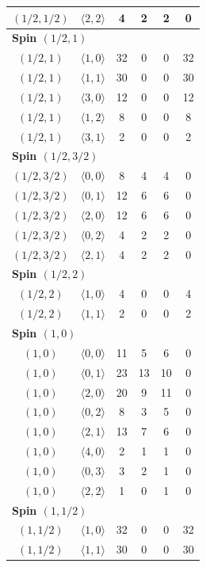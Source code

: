 \begin{longtable}{c c c c c c}
$(1/2,1/2)$ & $\langle 2,2\rangle$ & 4 & 2 & 2 & 0 \\
\midrule
\multicolumn{6}{l}{\textbf{Spin $(1/2,1)$}}\\
$(1/2,1)$ & $\langle 1,0\rangle$ & 32 & 0 & 0 & 32 \\
$(1/2,1)$ & $\langle 1,1\rangle$ & 30 & 0 & 0 & 30 \\
$(1/2,1)$ & $\langle 3,0\rangle$ & 12 & 0 & 0 & 12 \\
$(1/2,1)$ & $\langle 1,2\rangle$ & 8 & 0 & 0 & 8 \\
$(1/2,1)$ & $\langle 3,1\rangle$ & 2 & 0 & 0 & 2 \\
\midrule
\multicolumn{6}{l}{\textbf{Spin $(1/2,3/2)$}}\\
$(1/2,3/2)$ & $\langle 0,0\rangle$ & 8 & 4 & 4 & 0 \\
$(1/2,3/2)$ & $\langle 0,1\rangle$ & 12 & 6 & 6 & 0 \\
$(1/2,3/2)$ & $\langle 2,0\rangle$ & 12 & 6 & 6 & 0 \\
$(1/2,3/2)$ & $\langle 0,2\rangle$ & 4 & 2 & 2 & 0 \\
$(1/2,3/2)$ & $\langle 2,1\rangle$ & 4 & 2 & 2 & 0 \\
\midrule
\multicolumn{6}{l}{\textbf{Spin $(1/2,2)$}}\\
$(1/2,2)$ & $\langle 1,0\rangle$ & 4 & 0 & 0 & 4 \\
$(1/2,2)$ & $\langle 1,1\rangle$ & 2 & 0 & 0 & 2 \\
\midrule
\multicolumn{6}{l}{\textbf{Spin $(1,0)$}}\\
$(1,0)$ & $\langle 0,0\rangle$ & 11 & 5 & 6 & 0 \\
$(1,0)$ & $\langle 0,1\rangle$ & 23 & 13 & 10 & 0 \\
$(1,0)$ & $\langle 2,0\rangle$ & 20 & 9 & 11 & 0 \\
$(1,0)$ & $\langle 0,2\rangle$ & 8 & 3 & 5 & 0 \\
$(1,0)$ & $\langle 2,1\rangle$ & 13 & 7 & 6 & 0 \\
$(1,0)$ & $\langle 4,0\rangle$ & 2 & 1 & 1 & 0 \\
$(1,0)$ & $\langle 0,3\rangle$ & 3 & 2 & 1 & 0 \\
$(1,0)$ & $\langle 2,2\rangle$ & 1 & 0 & 1 & 0 \\
\midrule
\multicolumn{6}{l}{\textbf{Spin $(1,1/2)$}}\\
$(1,1/2)$ & $\langle 1,0\rangle$ & 32 & 0 & 0 & 32 \\
$(1,1/2)$ & $\langle 1,1\rangle$ & 30 & 0 & 0 & 30 \\

\end{longtable}
